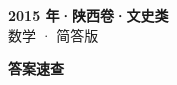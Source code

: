 \documentclass[zihao=-4, a4paper]{ctexart}
\begin{document}
\begin{center}
  {\Large\bfseries 2015 年·陕西卷·文史类}\\[4pt]
  {\large 数学 · 简答版}
\end{center}
\medskip
{}

\clearpage
{}
\begin{center}{\Large\bfseries 答案速查}\end{center}
\medskip

\end{document}
